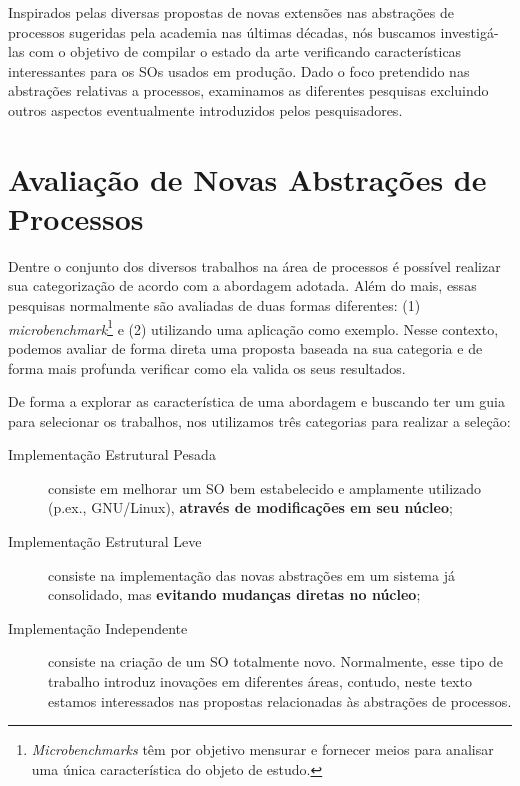Inspirados pelas diversas propostas de novas extensões nas abstrações de
processos sugeridas pela academia nas últimas décadas, nós buscamos
investigá-las com o objetivo de compilar o estado da arte verificando
características interessantes para os SOs usados em produção. Dado o foco
pretendido nas abstrações relativas a processos, examinamos as diferentes
pesquisas excluindo outros aspectos eventualmente introduzidos pelos
pesquisadores.

\section{Avaliação de Novas Abstrações de Processos}

Dentre o conjunto dos diversos trabalhos na área de processos é possível
realizar sua categorização de acordo com a abordagem adotada. Além do
mais, essas pesquisas normalmente são avaliadas de duas formas diferentes: (1)
\emph{microbenchmark}\footnote{\emph{Microbenchmarks} têm por objetivo mensurar
e fornecer meios para analisar uma única característica do objeto de estudo.} e
(2) utilizando uma aplicação como exemplo. Nesse contexto, podemos avaliar de
forma direta uma proposta baseada na sua categoria e de forma mais profunda
verificar como ela valida os seus resultados.

De forma a explorar as característica de uma abordagem e buscando ter um guia
para selecionar os trabalhos, nos utilizamos três categorias para realizar a
seleção:

\begin{description}
\item [Implementação Estrutural Pesada]

consiste em melhorar um SO bem estabelecido e amplamente utilizado (p.ex.,
GNU/Linux), \textbf{através de modificações em seu núcleo};

\item [Implementação Estrutural Leve]

consiste na implementação das novas abstrações em um sistema já consolidado,
mas \textbf{evitando mudanças diretas no núcleo};

\item [Implementação Independente]

consiste na criação de um SO totalmente novo. Normalmente, esse tipo de
trabalho introduz inovações em diferentes áreas, contudo, neste texto estamos
interessados nas propostas relacionadas às abstrações de processos.

\end{description}

